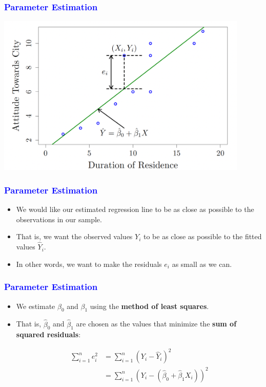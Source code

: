 \documentclass[12pt]{beamer}
\begin{document}
\begin{frame}
	\frametitle{\textcolor{blue}{Parameter Estimation}}
	\centering
\includegraphics[width=12cm]{para3.png}
\end{frame}
\begin{frame}
	\frametitle{\textcolor{blue}{Parameter Estimation}}
	
	\begin{itemize}[label={\color{blue}$\blacktriangleright$}]
		\item We would like our estimated regression line to be as close as possible to the observations in our sample.
		
		\item That is, we want the observed values $Y_i$ to be as close as possible to the fitted values $\hat{Y}_i$.
		
		\item In other words, we want to make the residuals $e_i$ as small as we can.
	\end{itemize}
	
\end{frame}
\begin{frame}
	\frametitle{\textcolor{blue}{Parameter Estimation}}
	
	\begin{itemize}[label={\color{blue}$\blacktriangleright$}]
		\item We estimate $\beta_0$ and $\beta_1$ using the \textbf{method of least squares}.
		
		\item That is, $\hat{\beta}_0$ and $\hat{\beta}_1$ are chosen as the values that minimize the \textbf{sum of squared residuals}:
		
		\begin{align*}
			\sum_{i=1}^n e_i^2 &= \sum_{i=1}^n \left(Y_i - \hat{Y}_i\right)^2 \\[1ex]
			&= \sum_{i=1}^n \left(Y_i - \left(\hat{\beta}_0 + \hat{\beta}_1X_i\right)\right)^2
		\end{align*}
	\end{itemize}
	
\end{frame}
\end{document}
